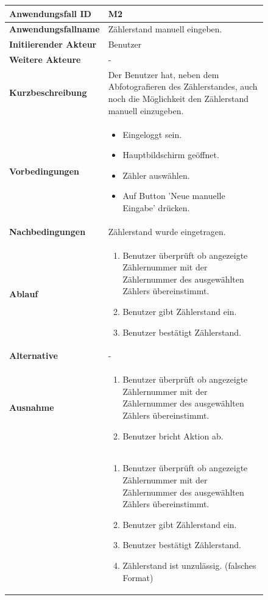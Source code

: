 \newpage

\begin{figure}[h]
	\centering
	\begin{tabularx}{\textwidth}{ X | X }
		\textbf{Anwendungsfall ID} & M2 \\ \hline
		\textbf{Anwendungsfallname} & Zählerstand manuell eingeben. \\ \hline
		\textbf{Initiierender Akteur} & Benutzer \\ \hline
		\textbf{Weitere Akteure} & - \\ \hline
		\textbf{Kurzbeschreibung} & Der Benutzer hat, neben dem Abfotografieren des Zählerstandes, auch noch die Möglichkeit den Zählerstand manuell 									einzugeben.  \\ \hline
		\textbf{Vorbedingungen} & 
		\begin {itemize}
			\item Eingeloggt sein. 
			\item Hauptbildschirm geöffnet.
			\item Zähler auswählen.
			\item Auf Button 'Neue manuelle Eingabe' drücken.
		\end{itemize}\\ \hline
		\textbf{Nachbedingungen} & Zählerstand wurde eingetragen.  \\ \hline
		\textbf{Ablauf} &
		\begin{enumerate}
			\item Benutzer überprüft ob angezeigte Zählernummer mit der Zählernummer des ausgewählten Zählers übereinstimmt.
			\item Benutzer gibt Zählerstand ein.
			\item Benutzer bestätigt Zählerstand.
		\end{enumerate} \\ \hline
		\textbf{Alternative} & - \\ \hline
		\textbf{Ausnahme} &
		\begin{enumerate}
			\item Benutzer überprüft ob angezeigte Zählernummer mit der Zählernummer des ausgewählten Zählers übereinstimmt.
			\item Benutzer bricht Aktion ab.
		\end{enumerate}  \\  &
		\begin{enumerate}
			\item Benutzer überprüft ob angezeigte Zählernummer mit der Zählernummer des ausgewählten Zählers übereinstimmt.
			\item Benutzer gibt Zählerstand ein.
			\item Benutzer bestätigt Zählerstand.
			\item Zählerstand ist unzulässig. (falsches Format)


\end{enumerate}
\end{tabularx}
\end{figure}
